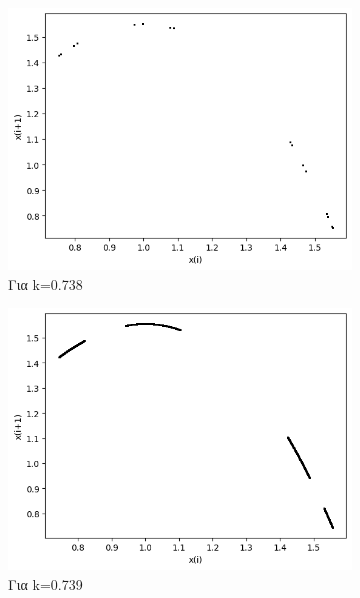 \begin{figure}[h!]
	\centering
	\begin{subfigure}[b]{0.4\textwidth}
		\centering
		\includegraphics[width=\textwidth]{LateX images/graphs q14/g17}
		\caption{Για k=0.738}
		\label{f:k74}
	\end{subfigure}
	\hfill
	\begin{subfigure}[b]{0.4\textwidth}
		\centering
		\includegraphics[width=\textwidth]{LateX images/graphs q14/g18}
		\caption{Για k=0.739}
		\label{f:k75}
	\end{subfigure}
	\hfill
	\begin{subfigure}[b]{0.4\textwidth}
		\centering

\end{subfigure}
\end{figure}
